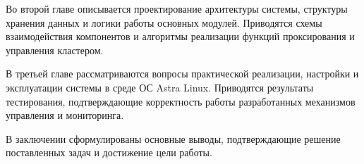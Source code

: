 Во второй главе описывается проектирование архитектуры системы, структуры хранения данных и логики работы основных модулей. Приводятся схемы взаимодействия компонентов и алгоритмы реализации функций проксирования и управления кластером.

В третьей главе рассматриваются вопросы практической реализации, настройки и эксплуатации системы в среде ОС Astra Linux. Приводятся результаты тестирования, подтверждающие корректность работы разработанных механизмов управления и мониторинга.

В заключении сформулированы основные выводы, подтверждающие решение поставленных задач и достижение цели работы.